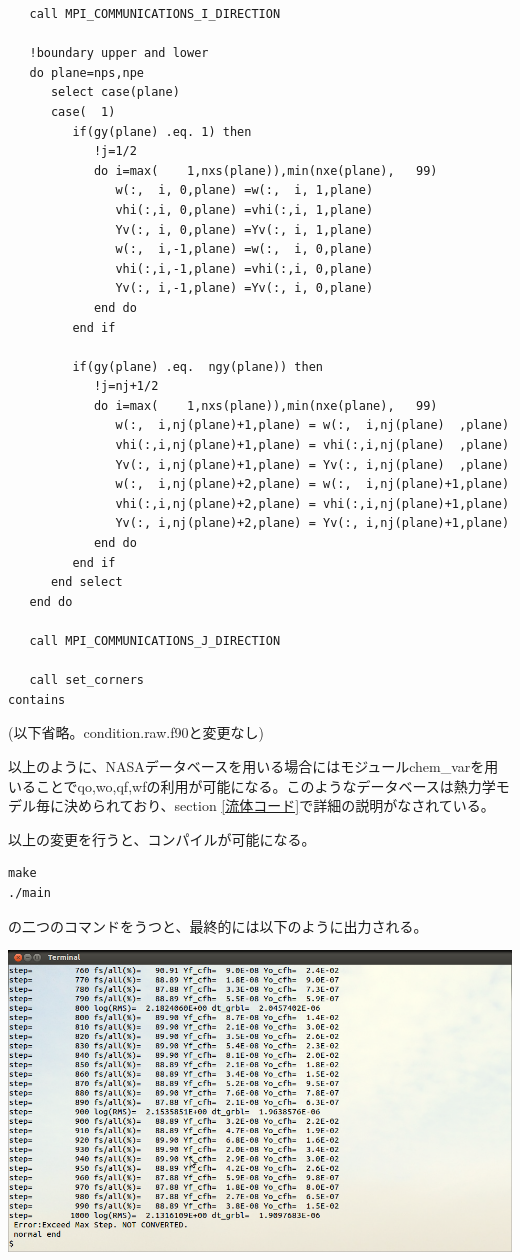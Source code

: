 \documentclass{jsarticle}
\begin{document}
\begin{verbatim}
   call MPI_COMMUNICATIONS_I_DIRECTION

   !boundary upper and lower
   do plane=nps,npe
      select case(plane)
      case(  1)
         if(gy(plane) .eq. 1) then
            !j=1/2
            do i=max(    1,nxs(plane)),min(nxe(plane),   99)
               w(:,  i, 0,plane) =w(:,  i, 1,plane)
               vhi(:,i, 0,plane) =vhi(:,i, 1,plane)
               Yv(:, i, 0,plane) =Yv(:, i, 1,plane)
               w(:,  i,-1,plane) =w(:,  i, 0,plane)
               vhi(:,i,-1,plane) =vhi(:,i, 0,plane)
               Yv(:, i,-1,plane) =Yv(:, i, 0,plane)
            end do
         end if

         if(gy(plane) .eq.  ngy(plane)) then
            !j=nj+1/2
            do i=max(    1,nxs(plane)),min(nxe(plane),   99)
               w(:,  i,nj(plane)+1,plane) = w(:,  i,nj(plane)  ,plane)
               vhi(:,i,nj(plane)+1,plane) = vhi(:,i,nj(plane)  ,plane)
               Yv(:, i,nj(plane)+1,plane) = Yv(:, i,nj(plane)  ,plane)
               w(:,  i,nj(plane)+2,plane) = w(:,  i,nj(plane)+1,plane)
               vhi(:,i,nj(plane)+2,plane) = vhi(:,i,nj(plane)+1,plane)
               Yv(:, i,nj(plane)+2,plane) = Yv(:, i,nj(plane)+1,plane)
            end do
         end if
      end select
   end do

   call MPI_COMMUNICATIONS_J_DIRECTION

   call set_corners
contains

\end{verbatim}%

(以下省略。condition.raw.f90と変更なし)

\hspace{1em}


以上のように、NASAデータベースを用いる場合にはモジュールchem\_varを用いることでqo,wo,qf,wfの利用が可能になる。このようなデータベースは熱力学モデル毎に決められており、section \ref{流体コード}で詳細の説明がなされている。

以上の変更を行うと、コンパイルが可能になる。
\begin{verbatim}
make
./main
\end{verbatim}
の二つのコマンドをうつと、最終的には以下のように出力される。
\begin{center}
\includegraphics[width=.8\textwidth,bb=0 0 962 577]{tutorial_img/200.png}
\end{center}
\end{document}
